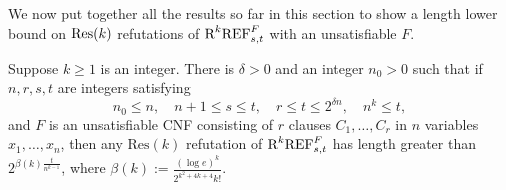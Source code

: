 We now put together all the results so far in this section to show a length lower bound on $\textnormal{Res}(k)$ refutations of $\textnormal{R}^k\textnormal{REF}^{F}_{s,t}$ with an unsatisfiable $F$. 

\begin{theorem}
\label{thm:main_size_lb_for_RkREF^F_st}
Suppose $k \geq 1$ is an integer. There is $\delta > 0$ and an integer $n_0 > 0$ such that if $n,r,s,t$ are integers satisfying 
\begin{equation}
\label{eq:conditions_on_n,r,s,t_in_the_main_theorem} 
n_0 \leq n, \quad n+1 \leq s \leq t, \quad r \leq t \leq 2^{\delta n}, \quad n^k \leq t,
\end{equation}
and $F$ is an unsatisfiable CNF consisting of $r$ clauses $C_1,\ldots, C_r$ in $n$ variables $x_1,\ldots, x_n$, then any $\text{Res}(k)$ refutation of $\textnormal{R}^k\textnormal{REF}^{F}_{s,t}$ has length greater than $2^{\beta(k) \frac{t}{n^{k-1}}}$, where $\beta(k) := \frac{(\log e)^k}{2^{k^2 + 4k + 4} k!}$. 
\end{theorem}


